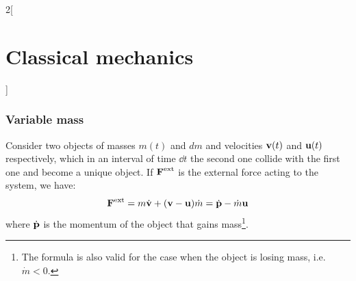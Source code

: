 \documentclass[../../../main.tex]{subfiles}
\begin{document}
\begin{multicols}{2}[\section{Classical mechanics}]
    \subsubsection*{Variable mass}
    \begin{prop}
        Consider two objects of masses $m(t)$ and $dm$ and velocities $\boldsymbol{\mathrm{v}}(t)$ and $\boldsymbol{\mathrm{u}}(t)$ respectively, which in an interval of time $\dd t$ the second one collide with the first one and become a unique object. If $\boldsymbol{\mathrm{F}}^\text{ext}$ is the external force acting to the system, we have:
        \begin{equation}
            \boldsymbol{\mathrm{F}}^\text{ext}=m\dot{\boldsymbol{\mathrm{v}}}+(\boldsymbol{\mathrm{v}}-\boldsymbol{\mathrm{u}})\dot{m}=\dot{\boldsymbol{\mathrm{p}}}-\dot{m}\boldsymbol{\mathrm{u}}
            \label{mass}
        \end{equation}
        where $\dot{\boldsymbol{\mathrm{p}}}$ is the momentum of the object that gains mass\footnote{The formula is also valid for the case when the object is losing mass, i.e. $\dot{m}<0$.}.
    \end{prop}

\end{multicols}
\end{document}
